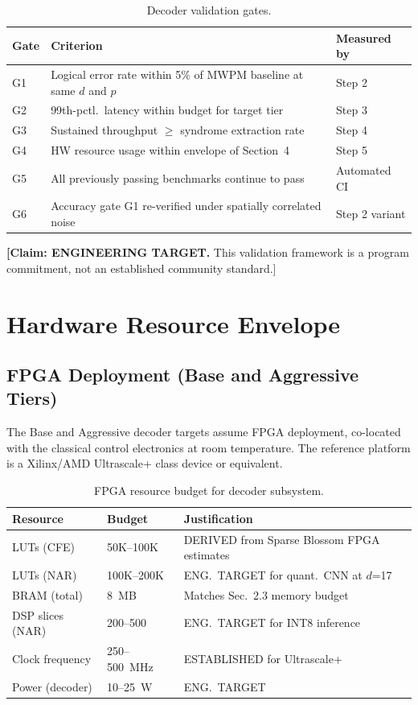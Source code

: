 \documentclass[conference]{IEEEtran}
\begin{document}
\begin{table}[H]
\centering
\caption{Decoder validation gates.}
\label{tab:validation-gates}
\footnotesize
\begin{tabularx}{\columnwidth}{lL{3.0cm}L{2.5cm}}
\toprule
\textbf{Gate} & \textbf{Criterion} & \textbf{Measured by} \\
\midrule
G1 & Logical error rate within 5\% of MWPM baseline at same $d$ and $p$ & Step 2 \\
G2 & 99th-pctl.\ latency within budget for target tier & Step 3 \\
G3 & Sustained throughput $\geq$ syndrome extraction rate & Step 4 \\
G4 & HW resource usage within envelope of Section~4 & Step 5 \\
G5 & All previously passing benchmarks continue to pass & Automated CI \\
G6 & Accuracy gate G1 re-verified under spatially correlated noise & Step 2 variant \\
\bottomrule
\end{tabularx}
\end{table}

\textbf{[Claim: ENGINEERING TARGET.} This validation framework is a program commitment, not an established community standard.]

\section{Hardware Resource Envelope}

\subsection{FPGA Deployment (Base and Aggressive Tiers)}

The Base and Aggressive decoder targets assume FPGA deployment, co-located with the classical control electronics at room temperature. The reference platform is a Xilinx/AMD Ultrascale+ class device or equivalent.

\begin{table}[H]
\centering
\caption{FPGA resource budget for decoder subsystem.}
\label{tab:fpga-budget}
\footnotesize
\begin{tabularx}{\columnwidth}{L{2.5cm}L{2.0cm}L{2.5cm}}
\toprule
\textbf{Resource} & \textbf{Budget} & \textbf{Justification} \\
\midrule
LUTs (CFE) & 50K--100K & DERIVED from Sparse Blossom FPGA estimates \\
LUTs (NAR) & 100K--200K & ENG.\ TARGET for quant.\ CNN at $d$=17 \\
BRAM (total) & 8~MB & Matches Sec.~2.3 memory budget \\
DSP slices (NAR) & 200--500 & ENG.\ TARGET for INT8 inference \\
Clock frequency & 250--500~MHz & ESTABLISHED for Ultrascale+ \\
Power (decoder) & 10--25~W & ENG.\ TARGET \\
\bottomrule
\end{tabularx}
\end{table}
\end{document}
